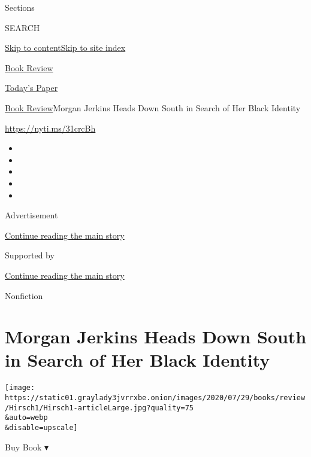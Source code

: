 Sections

SEARCH

\protect\hyperlink{site-content}{Skip to
content}\protect\hyperlink{site-index}{Skip to site index}

\href{https://www.nytimes3xbfgragh.onion/section/books/review}{Book
Review}

\href{https://myaccount.nytimes3xbfgragh.onion/auth/login?response_type=cookie\&client_id=vi}{}

\href{https://www.nytimes3xbfgragh.onion/section/todayspaper}{Today's
Paper}

\href{/section/books/review}{Book Review}\textbar{}Morgan Jerkins Heads
Down South in Search of Her Black Identity

\url{https://nyti.ms/31crcBh}

\begin{itemize}
\item
\item
\item
\item
\item
\end{itemize}

Advertisement

\protect\hyperlink{after-top}{Continue reading the main story}

Supported by

\protect\hyperlink{after-sponsor}{Continue reading the main story}

Nonfiction

\hypertarget{morgan-jerkins-heads-down-south-in-search-of-her-black-identity}{%
\section{Morgan Jerkins Heads Down South in Search of Her Black
Identity}\label{morgan-jerkins-heads-down-south-in-search-of-her-black-identity}}

\texttt{[image: https://static01.graylady3jvrrxbe.onion/images/2020/07/29/books/review/Hirsch1/Hirsch1-articleLarge.jpg?quality=75\\\&auto=webp\\\&disable=upscale]}

Buy Book ▾

